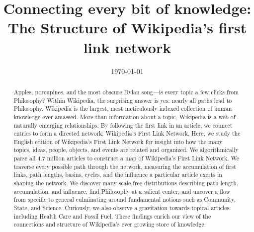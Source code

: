\documentclass[pre,twocolumn,twoside,superscriptaddress,floatfix, aps, 10pt]{revtex4-1}
\begin{document}
\title{\protect
Connecting every bit of knowledge: \\
The Structure of Wikipedia's first link network
}

\date{\today}

\author{
}


\author{
}


\author{
}




\begin{abstract}
  \protect
Apples, porcupines, and the most obscure Dylan song---is every topic a few clicks from Philosophy? 
Within Wikipedia, the surprising answer is yes: nearly all 
paths lead to Philosophy.
Wikipedia is the largest, most meticulously indexed collection of human knowledge ever amassed. 
More than information about a topic, Wikipedia is a web of naturally emerging relationships.  
By following the first link in an article, we connect entries to form a directed network: Wikipedia's First Link Network. 
Here, we study the English edition of Wikipedia's First Link Network for insight into how the many topics, ideas, people, objects, and events
are related and organized.  
We algorithmically parse all 4.7 million articles to construct a map of Wikipedia's First Link Network. 
We traverse every possible path through the network, 
measuring the accumulation of first links, path lengths, basins, cycles, and the influence a particular article exerts in shaping the 
network.
We discover many scale-free distributions describing path length, 
accumulation, and influence; find Philosophy at a salient center; and uncover a flow from specific to general 
culminating around fundamental notions such as Community, State, and Science. 
Curiously, we also observe a gravitation towards topical articles including Health Care and Fossil Fuel.
These findings enrich our view of the connections and structure of
Wikipedia's ever growing store of knowledge.
 
\end{abstract}
\end{document}
